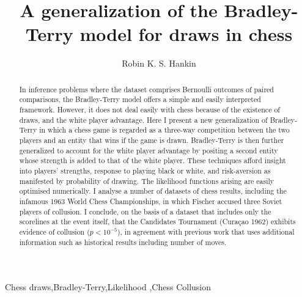 \documentclass[review]{elsarticle}
\begin{document}
\begin{frontmatter}

\title{A generalization of the Bradley-Terry model for draws in chess}

\author{Robin K. S. Hankin}
\address{AUT University, 2-14 Wakefield Street, Auckland, New Zealand}


\begin{abstract}
In inference problems where the dataset comprises Bernoulli outcomes
of paired comparisons, the Bradley-Terry model offers a simple and
easily interpreted framework.  However, it does not deal easily with
chess because of the existence of draws, and the white player
advantage.  Here I present a new generalization of Bradley-Terry in
which a chess game is regarded as a three-way competition between the
two players and an entity that wins if the game is drawn.
Bradley-Terry is then further generalized to account for the white
player advantage by positing a second entity whose strength is added
to that of the white player.  These techniques afford insight into
players' strengths, response to playing black or white, and
risk-aversion as manifested by probability of drawing.  The likelihood
functions arising are easily optimised numerically.  I analyse a
number of datasets of chess results, including the infamous 1963 World
Chess Championships, in which Fischer accused three Soviet players of
collusion.  I conclude, on the basis of a dataset that includes only
the scorelines at the event itself, that the Candidates Tournament
(Cura\c{c}ao 1962) exhibits evidence of collusion ($p<10^{-5}$), in
agreement with previous work that uses additional information such as
historical results including number of moves.
\end{abstract}

\begin{keyword}
  Chess draws\sep Bradley-Terry\sep Likelihood \sep Chess Collusion
\end{keyword}

\end{frontmatter}

\linenumbers

\newcommand\headercell[1]{%
   \smash[b]{\begin{tabular}[t]{@{}c@{}} #1 \end{tabular}}}
\newcommand{\draw}{\ensuremath{\mathfrak{D}}}
\newcommand{\cdraw}{\ensuremath{\mathfrak{C}}}
\newcommand{\white}{\ensuremath{\mathfrak{W}}}
\newcommand{\Prob}{\operatorname{Prob}}
\end{document}
